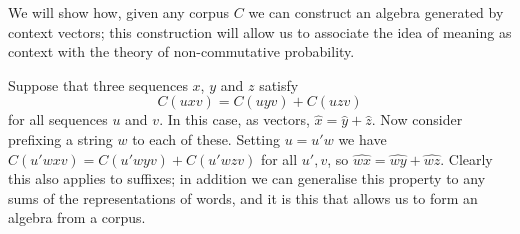 \documentclass[11pt]{report}
\begin{document}


We will show how, given any corpus $C$ we can construct an algebra generated by context vectors; this construction will allow us to associate the idea of meaning as context with the theory of non-commutative probability.

Suppose that three sequences $x$, $y$ and $z$ satisfy
$$C(uxv) = C(uyv) + C(uzv)$$
for all sequences $u$ and $v$. In this case, as vectors, $\hat{x} = \hat{y} + \hat{z}$. Now consider prefixing a string $w$ to each of these. Setting $u = u'w$ we have $C(u'wxv) = C(u'wyv) + C(u'wzv)$ for all $u',v$, so $\widehat{wx} = \widehat{wy} + \widehat{wz}$. Clearly this also applies to suffixes; in addition we can generalise this property to any sums of the representations of words, and it is this that allows us to form an algebra from a corpus.
\end{document}
